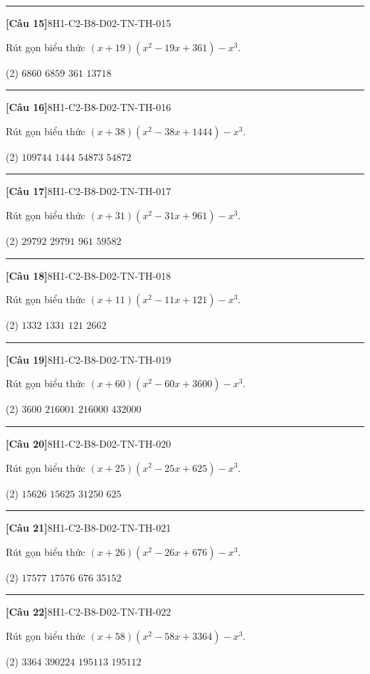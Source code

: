 \documentclass[12pt,a4paper]{article}
\newif\ifloigiai
\newenvironment{cauhoi}[2]{%
  \par\medskip\noindent\rule{\textwidth}{0.4pt}\par\nopagebreak
  \noindent\textbf{[#1]}\hfill{\scriptsize\ttfamily #2}\par\nopagebreak\smallskip}{\par}
\newcommand{\dapan}[1]{\ifloigiai\par\smallskip\noindent\textit{Đáp án:} \textbf{#1}\par\fi}
\begin{document}
\begin{cauhoi}{Câu 15}{8H1-C2-B8-D02-TN-TH-015}
Rút gọn biểu thức $(x+19)(x^{2}-19x+361)-x^{3}$.
\begin{tasks}(2)
\task $6860$
\task $6859$
\task $361$
\task $13718$
\end{tasks}
\dapan{B}
\end{cauhoi}
\begin{cauhoi}{Câu 16}{8H1-C2-B8-D02-TN-TH-016}
Rút gọn biểu thức $(x+38)(x^{2}-38x+1444)-x^{3}$.
\begin{tasks}(2)
\task $109744$
\task $1444$
\task $54873$
\task $54872$
\end{tasks}
\dapan{D}
\end{cauhoi}
\begin{cauhoi}{Câu 17}{8H1-C2-B8-D02-TN-TH-017}
Rút gọn biểu thức $(x+31)(x^{2}-31x+961)-x^{3}$.
\begin{tasks}(2)
\task $29792$
\task $29791$
\task $961$
\task $59582$
\end{tasks}
\dapan{B}
\end{cauhoi}
\begin{cauhoi}{Câu 18}{8H1-C2-B8-D02-TN-TH-018}
Rút gọn biểu thức $(x+11)(x^{2}-11x+121)-x^{3}$.
\begin{tasks}(2)
\task $1332$
\task $1331$
\task $121$
\task $2662$
\end{tasks}
\dapan{B}
\end{cauhoi}
\begin{cauhoi}{Câu 19}{8H1-C2-B8-D02-TN-TH-019}
Rút gọn biểu thức $(x+60)(x^{2}-60x+3600)-x^{3}$.
\begin{tasks}(2)
\task $3600$
\task $216001$
\task $216000$
\task $432000$
\end{tasks}
\dapan{C}
\end{cauhoi}
\begin{cauhoi}{Câu 20}{8H1-C2-B8-D02-TN-TH-020}
Rút gọn biểu thức $(x+25)(x^{2}-25x+625)-x^{3}$.
\begin{tasks}(2)
\task $15626$
\task $15625$
\task $31250$
\task $625$
\end{tasks}
\dapan{B}
\end{cauhoi}
\begin{cauhoi}{Câu 21}{8H1-C2-B8-D02-TN-TH-021}
Rút gọn biểu thức $(x+26)(x^{2}-26x+676)-x^{3}$.
\begin{tasks}(2)
\task $17577$
\task $17576$
\task $676$
\task $35152$
\end{tasks}
\dapan{B}
\end{cauhoi}
\begin{cauhoi}{Câu 22}{8H1-C2-B8-D02-TN-TH-022}
Rút gọn biểu thức $(x+58)(x^{2}-58x+3364)-x^{3}$.
\begin{tasks}(2)
\task $3364$
\task $390224$
\task $195113$
\task $195112$
\end{tasks}
\dapan{D}
\end{cauhoi}
\end{document}
